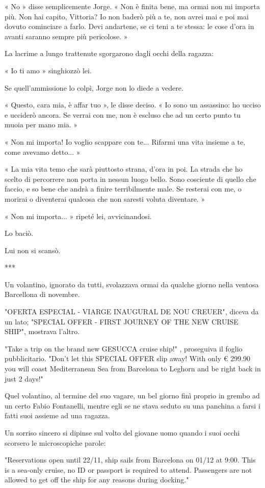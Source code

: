 « No » disse semplicemente Jorge. « Non è finita bene, ma ormai non mi importa più. Non hai capito, Vittoria? Io non baderò più a te, non avrei mai e poi mai dovuto cominciare a farlo. Devi andartene, se ci teni a te stessa: le cose d'ora in avanti saranno sempre più pericolose. »

La lacrime a lungo trattenute sgorgarono dagli occhi della ragazza:

« Io ti amo » singhiozzò lei.

Se quell'ammissione lo colpì, Jorge non lo diede a vedere.

« Questo, cara mia, è affar tuo », le disse deciso. « Io sono un assassino: ho ucciso e ucciderò ancora. Se verrai con me, non è escluso che ad un certo punto tu muoia per mano mia. »

« Non mi importa! Io voglio scappare con te... Rifarmi una vita insieme a te, come avevamo detto... »

« La mia vita temo che sarà piuttosto strana, d'ora in poi. La strada che ho scelto di percorrere non porta in nessun luogo bello. Sono cosciente di quello che faccio, e so bene che andrà a finire terribilmente male. Se resterai con me, o morirai o diventerai qualcosa che non saresti voluta diventare. »

« Non mi importa... » ripeté lei, avvicinandosi.

Lo baciò.

Lui non si scansò.

***

Un volantino, ignorato da tutti, svolazzava ormai da qualche giorno nella ventosa Barcellona di novembre.

"OFERTA ESPECIAL - VIARGE INAUGURAL DE NOU CREUER", diceva da un lato; "SPECIAL OFFER - FIRST JOURNEY OF THE NEW CRUISE SHIP", mostrava l'altro.

"Take a trip on the brand new GESUCCA cruise ship!" , proseguiva il foglio pubblicitario. "Don't let this SPECIAL OFFER slip away! With only € 299.90 you will coast Mediterranean Sea from Barcelona to Leghorn and be right back in just 2 days!"

Quel volantino, al termine del suo vagare, un bel giorno finì proprio in grembo ad un certo Fabio Fontanelli, mentre egli se ne stava seduto su una panchina a farsi i fatti suoi assieme ad una ragazza.

Un sorriso sincero si dipinse sul volto del giovane uomo quando i suoi occhi scorsero le microscopiche parole:

"Reservations open until 22/11, ship sails from Barcelona on 01/12 at 9:00. This is a sea-only cruise, no ID or passport is required to attend. Passengers are not allowed to get off the ship for any reasons during docking."

